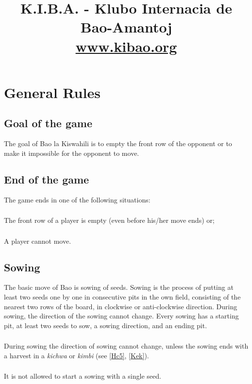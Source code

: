 \documentclass[12pt,a4paper]{article}
\title{K.I.B.A. - Klubo Internacia de Bao-Amantoj\\\url{www.kibao.org}}
\date{}
\begin{document}
\maketitle
\section{General Rules}\label{GR}
\subsection{Goal of the game}\label{Gotg} 
The goal of Bao la Kiswahili is to empty the front row of the opponent or to make it impossible for the opponent to move.
\subsection{End of the game}\label{Eotg} 
The game ends in one of the following situations:
\subsubsection{}\label{Eotg1}
The front row of a player is empty (even before his/her move ends) or;
\subsubsection{}\label{Eotg2}
A player cannot move.

\subsection{Sowing}\label{Sow} 
The basic move of Bao is sowing of seeds.  Sowing is the process of putting at least two seeds one by one in consecutive pits in the own field, consisting of the nearest two rows of the board, in clockwise or anti-clockwise direction.  During sowing, the direction of the sowing cannot change. Every sowing has a starting pit, at least two seeds to sow, a sowing direction, and an ending pit.
\subsubsection{}\label{Sow1.1}
During sowing the direction of sowing cannot change, unless the sowing ends with a harvest in a {\it kichwa} or {\it kimbi} (see \ref{Hc5}, \ref{Kek}).
\subsubsection{}\label{Sow1.2}
It is not allowed to start a sowing with a single seed.
\end{document}
